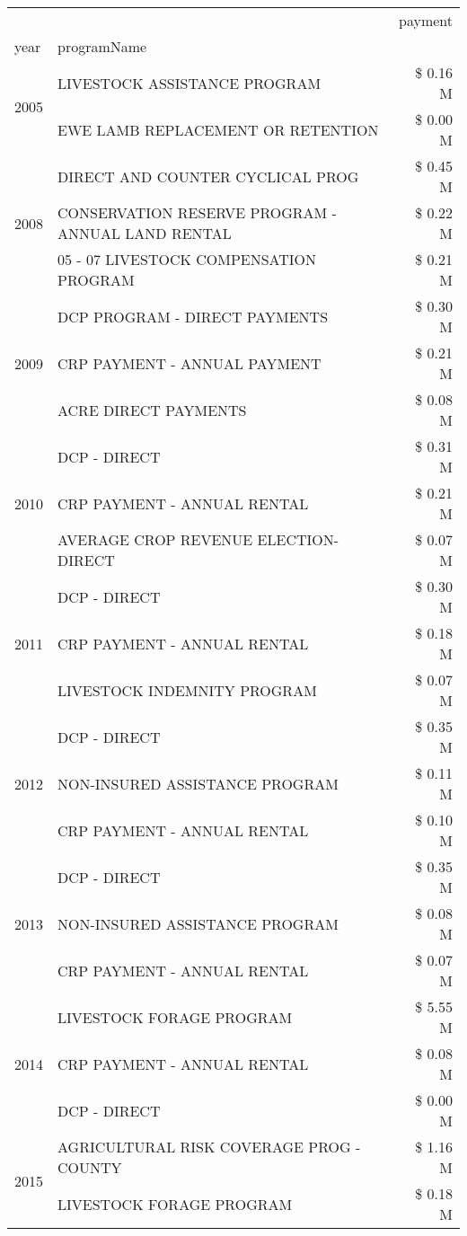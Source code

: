 \begin{tabular}{llr}
\toprule
 &  & payment \\
year & programName &  \\
\midrule
\multirow[t]{2}{*}{2005} & LIVESTOCK ASSISTANCE PROGRAM & \$ 0.16 M \\
 & EWE LAMB REPLACEMENT OR RETENTION & \$ 0.00 M \\
\cline{1-3}
\multirow[t]{3}{*}{2008} & DIRECT AND COUNTER CYCLICAL PROG & \$ 0.45 M \\
 & CONSERVATION RESERVE PROGRAM - ANNUAL LAND RENTAL & \$ 0.22 M \\
 & 05 - 07 LIVESTOCK COMPENSATION PROGRAM & \$ 0.21 M \\
\cline{1-3}
\multirow[t]{3}{*}{2009} & DCP PROGRAM - DIRECT PAYMENTS & \$ 0.30 M \\
 & CRP PAYMENT - ANNUAL PAYMENT & \$ 0.21 M \\
 & ACRE DIRECT PAYMENTS & \$ 0.08 M \\
\cline{1-3}
\multirow[t]{3}{*}{2010} & DCP - DIRECT & \$ 0.31 M \\
 & CRP PAYMENT - ANNUAL RENTAL & \$ 0.21 M \\
 & AVERAGE CROP REVENUE ELECTION-DIRECT & \$ 0.07 M \\
\cline{1-3}
\multirow[t]{3}{*}{2011} & DCP - DIRECT & \$ 0.30 M \\
 & CRP PAYMENT - ANNUAL RENTAL & \$ 0.18 M \\
 & LIVESTOCK INDEMNITY PROGRAM & \$ 0.07 M \\
\cline{1-3}
\multirow[t]{3}{*}{2012} & DCP - DIRECT & \$ 0.35 M \\
 & NON-INSURED ASSISTANCE PROGRAM & \$ 0.11 M \\
 & CRP PAYMENT - ANNUAL RENTAL & \$ 0.10 M \\
\cline{1-3}
\multirow[t]{3}{*}{2013} & DCP - DIRECT & \$ 0.35 M \\
 & NON-INSURED ASSISTANCE PROGRAM & \$ 0.08 M \\
 & CRP PAYMENT - ANNUAL RENTAL & \$ 0.07 M \\
\cline{1-3}
\multirow[t]{3}{*}{2014} & LIVESTOCK FORAGE PROGRAM & \$ 5.55 M \\
 & CRP PAYMENT - ANNUAL RENTAL & \$ 0.08 M \\
 & DCP - DIRECT & \$ 0.00 M \\
\cline{1-3}
\multirow[t]{3}{*}{2015} & AGRICULTURAL RISK COVERAGE PROG - COUNTY & \$ 1.16 M \\
 & LIVESTOCK FORAGE PROGRAM & \$ 0.18 M \\

\end{tabular}
